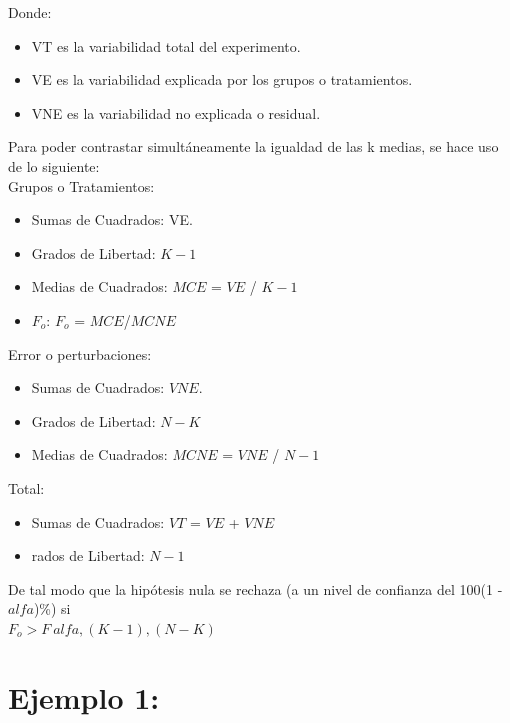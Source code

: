 \documentclass[12pt,letterpaper]{article}\usepackage[]{graphicx}\usepackage[]{color}
\begin{document}
Donde: 
\begin{itemize}
  \item VT es la variabilidad total del experimento.
  \item VE es la variabilidad explicada por los grupos o tratamientos.
  \item VNE es la variabilidad no explicada o residual. 
\end{itemize}

Para poder contrastar simult\'aneamente la igualdad de las k medias, se hace uso de lo siguiente:\\

Grupos o Tratamientos:
\begin{itemize}
  \item Sumas de Cuadrados: VE.
  \item Grados de Libertad: $K-1$
  \item Medias de Cuadrados: $MCE$ = $VE$ / $K-1$ 
  \item $F_o$: $F_o$ = $MCE$/$MCNE$
\end{itemize}

Error o perturbaciones:
\begin{itemize}
  \item Sumas de Cuadrados: $VNE$.
  \item Grados de Libertad: $N - K$
  \item Medias de Cuadrados: $MCNE$ = $VNE$ / $N-1$ 
\end{itemize}

Total:
\begin{itemize}
  \item Sumas de Cuadrados: $VT$ = $VE$ + $VNE$
  \item rados de Libertad: $N - 1$
\end{itemize}

De tal modo que la hip\'otesis nula se rechaza (a un nivel de confianza del  100(1 - $alfa$)\%) si\\

$F_o$$>$$F_\ alfa,(K-1),(N-K)$


\section{Ejemplo 1:}
\end{document}
